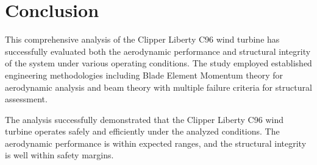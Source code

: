 \documentclass[11pt]{article}
\begin{document}
\section{Conclusion}

This comprehensive analysis of the Clipper Liberty C96 wind turbine has successfully evaluated both the aerodynamic performance and structural integrity of the system under various operating conditions. The study employed established engineering methodologies including Blade Element Momentum theory for aerodynamic analysis and beam theory with multiple failure criteria for structural assessment.

The analysis successfully demonstrated that the Clipper Liberty C96 wind turbine operates safely and efficiently under the analyzed conditions. The aerodynamic performance is within expected ranges, and the structural integrity is well within safety margins.

\newpage
\nocite{*}


\end{document}
